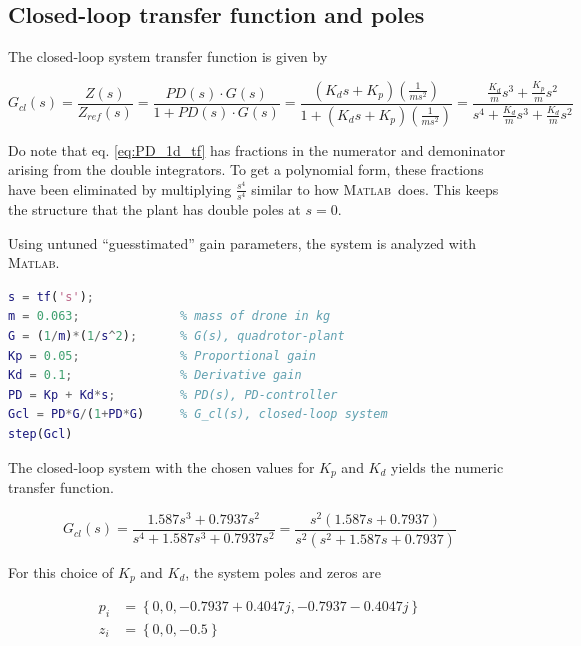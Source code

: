 \documentclass[a4paper]{report}
\newcommand{\MATLAB}{\textsc{Matlab}}
\begin{document}
\subsection{Closed-loop transfer function and poles}
The closed-loop system transfer function is given by

\begin{equation} \label{eq:PD_1d_tf}
G_{cl}(s) = \frac{Z(s)}{Z_{ref}(s)} 
= \frac{PD(s) \cdot G(s)}{1 + PD(s) \cdot G(s)}
= \frac{\left(K_d s + K_p \right) \left( \frac{1}{ms^2} \right)}{1+\left(K_d s + K_p \right) \left( \frac{1}{ms^2} \right)}
= \frac{\frac{K_d}{m}s^3 + \frac{K_p}{m} s^2 }{s^4 + \frac{K_d}{m} s^3 + \frac{K_d}{m} s^2}
\end{equation}

Do note that eq. \ref{eq:PD_1d_tf} has fractions in the numerator and demoninator arising from the double integrators. To get a polynomial form, these fractions have been eliminated by multiplying $\frac{s^4}{s^4}$ similar to how \MATLAB~does.
This keeps the structure that the plant has double poles at $s=0$.

Using untuned ``guesstimated'' gain parameters, the system is analyzed with \MATLAB.  \\

\begin{lstlisting}[language=Matlab, style=Matlab-editor]
s = tf('s');    
m = 0.063;          	% mass of drone in kg
G = (1/m)*(1/s^2);  	% G(s), quadrotor-plant
Kp = 0.05;          	% Proportional gain
Kd = 0.1;           	% Derivative gain
PD = Kp + Kd*s;     	% PD(s), PD-controller
Gcl = PD*G/(1+PD*G)   	% G_cl(s), closed-loop system
step(Gcl)
\end{lstlisting}

The closed-loop system with the chosen values for $K_p$ and $K_d$ yields the numeric transfer function.

\begin{equation} \label{eq:PD_1d_tf_num}
G_{cl}(s) = \frac{1.587 s^3 + 0.7937 s^2}{s^4 + 1.587 s^3 + 0.7937 s^2} 
= \frac{s^2 \left(1.587 s + 0.7937 \right)}{s^2 \left(s^2 + 1.587 s + 0.7937 \right)}
\end{equation}

For this choice of $K_p$ and $K_d$, the system poles and zeros are 

\begin{align*}
p_i &= \left\lbrace 0, 0, -0.7937 + 0.4047j, -0.7937 - 0.4047j \right\rbrace \\
z_i &= \left\lbrace 0,0,-0.5 \right\rbrace
\end{align*}
\end{document}

